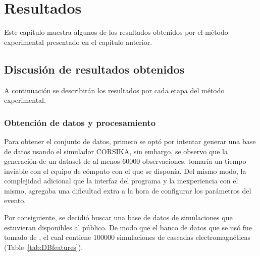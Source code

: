 
\chapter{Resultados} %

\label{Chapter5} %


Este capítulo muestra algunos de los resultados obtenidos por el método experimental presentado en el capítulo anterior.

\section{Discusión de resultados obtenidos}

A continuación se describirán los resultados por cada etapa del método experimental.

\subsection*{Obtención de datos y procesamiento}

Para obtener el conjunto de datos, primero se optó por intentar generar una base de datos usando el simulador CORSIKA, sin embargo, se observo que la generación de un dataset de al menos $60000$ observaciones, tomaría un tiempo inviable con el equipo de cómputo con el que se disponía. Del mismo modo, la complejidad adicional que la interfaz del programa y la inexperiencia con el mismo, agregaba una dificultad extra a la hora de configurar los parámetros del evento. 

Por consiguiente, se decidió buscar una base de datos de simulaciones que estuvieran disponibles al público. De modo que el banco de datos que se usó fue tomado de \parencite{Erdmann2018b}, el cual contiene $100000$ simulaciones de cascadas electromagnéticas (Table~\ref{tab:DBfeatures}).

